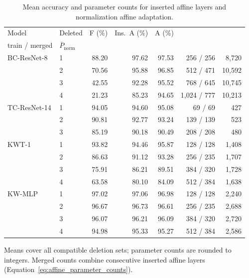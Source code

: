 \begin{table}[htbp]
\caption{Mean accuracy and parameter counts for inserted affine layers and normalization affine adaptation.}
\label{tab:gap_affine}
\centering\small
\setlength{\tabcolsep}{3pt}
\begin{tabular*}{\linewidth}{@{\extracolsep{\fill}}llrrrrr@{}}
\toprule
Model & Deleted & F (\%) & Ins.\ A (\%) & A (\%) & \shortstack{$\overline{P}_{\mathrm{insert}}$\\train / merged} & $\overline{P}_{\mathrm{norm}}$ \\
\midrule
BC-ResNet-8 & 1 & 88.20 & 97.62 & 97.53 & 256 / 256 & 8,720 \\
 & 2 & 70.56 & 95.88 & 96.85 & 512 / 471 & 10,592 \\
 & 3 & 42.55 & 92.28 & 95.52 & 768 / 645 & 10,745 \\
 & 4 & 21.23 & 85.23 & 94.65 & 1,024 / 777 & 10,213 \\
\midrule
TC-ResNet-14 & 1 & 94.05 & 94.60 & 95.08 & 69 / 69 & 427 \\
 & 2 & 90.81 & 92.77 & 93.24 & 139 / 139 & 523 \\
 & 3 & 85.19 & 90.18 & 90.49 & 208 / 208 & 480 \\
\midrule
KWT-1 & 1 & 93.82 & 94.46 & 95.87 & 128 / 128 & 1,408 \\
 & 2 & 86.63 & 91.12 & 93.28 & 256 / 235 & 1,707 \\
 & 3 & 75.91 & 86.21 & 89.51 & 384 / 320 & 1,728 \\
 & 4 & 63.58 & 80.10 & 84.09 & 512 / 384 & 1,638 \\
\midrule
KW-MLP & 1 & 97.02 & 97.06 & 96.98 & 128 / 128 & 2,240 \\
 & 2 & 96.67 & 96.73 & 96.61 & 256 / 235 & 2,688 \\
 & 3 & 96.07 & 96.21 & 96.09 & 384 / 320 & 2,720 \\
 & 4 & 94.98 & 95.33 & 95.27 & 512 / 384 & 2,586 \\
\bottomrule
\end{tabular*}
\par\smallskip\begin{minipage}{\linewidth}\footnotesize
Means cover all compatible deletion sets; parameter counts are rounded to integers. Merged counts combine consecutive inserted affine layers (Equation~\ref{eq:affine_parameter_counts}).
\end{minipage}
\end{table}
